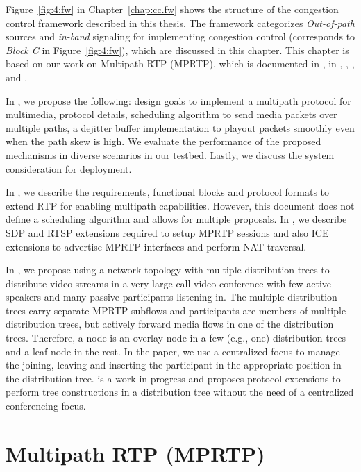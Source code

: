 Figure~\ref{fig:4:fw} in Chapter~\ref{chap:cc.fw} shows the structure of the
congestion control framework described in this thesis. The framework
categorizes \emph{Out-of-path} sources and \emph{in-band} signaling for
implementing congestion control (corresponds to \emph{Block C} in
Figure~\ref{fig:4:fw}), which are discussed in this chapter. This chapter is
based on our work on Multipath RTP (MPRTP), which is documented in
, in \cite{draft.mprtp}, \cite{draft.mprtp.sdp},
\cite{Globisch:AsymGrpComm}, and \cite{draft.rtcp.overlay}.

In , we propose the following: design goals to implement a
multipath protocol for multimedia, protocol details, scheduling algorithm to
send media packets over multiple paths, a dejitter buffer implementation to
playout packets smoothly even when the path skew is high. We evaluate the
performance of the proposed mechanisms in diverse scenarios in our testbed.
Lastly, we discuss the system consideration for deployment.

In \cite{draft.mprtp}, we describe the requirements, functional blocks and
protocol formats to extend RTP for enabling multipath capabilities. However,
this document does not define a scheduling algorithm and allows for multiple
proposals. In \cite{draft.mprtp.sdp}, we describe SDP and RTSP extensions
required to setup MPRTP sessions and also ICE extensions to advertise MPRTP
interfaces and perform NAT traversal.

In \cite{Globisch:AsymGrpComm}, we propose using a network topology with
multiple distribution trees to distribute video streams in a very large call
video conference with few active speakers and many passive participants
listening in. The multiple distribution trees carry separate MPRTP subflows
and participants are members of multiple distribution trees, but actively
forward media flows in one of the distribution trees. Therefore, a node is an
overlay node in a few (e.g., one) distribution trees and a leaf node in the
rest. In the paper, we use a centralized focus to manage the joining, leaving
and inserting the participant in the appropriate position in the distribution
tree. \cite{draft.rtcp.overlay} is a work in progress and proposes protocol
extensions to perform tree constructions in a distribution tree without the
need of a centralized conferencing focus.


\section{Multipath RTP (MPRTP)}

